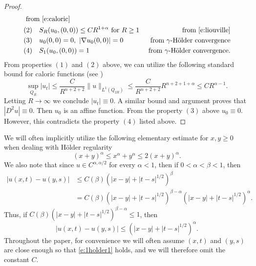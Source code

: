 \documentclass{amsart}
\numberwithin{equation}{section}
\begin{document}
\begin{proof}
\[\begin{aligned}
  &\text{ from } \eqref{e:caloric}\\
  &(2) \quad S_R(u_0,(0,0))\leq CR^{1+\alpha} \text{ for } R\geq 1 &\text{ from } \eqref{e:liouville} \\
  &(3) \quad u_0(0,0)=0, \ |\nabla u_0(0,0)|=0 &\text{ from $\gamma$-H\"older convergence} \\
  &(4) \quad S_1(u_0,(0,0))=1 &\text{ from $\gamma$-H\"older convergence}.
 \end{aligned}
 \]
 From properties $(1)$ and $(2)$ above, we can utilize the following standard bound for caloric functions (see \cite{e10})
 \[
 \sup_{Q_{R}} |u_t| \leq \frac{C}{R^{n+2+2}} \| u \|_{L^1(Q_{2R})}\leq \frac{C}{R^{n+2+2}} R^{n+2+1+\alpha}\leq C R^{\alpha-1}. 
 \]
 Letting $R \to \infty$ we conclude $|u_t|\equiv 0$. A similar bound and argument proves that $|D^2 u|\equiv 0$. Then $u_0$ is an affine function. From the property $(3)$ above $u_0 \equiv 0$. However, this contradicts the property $(4)$ listed above. 
\end{proof}

 We will often implicitly utilize the following elementary estimate for $x,y\geq0$ when dealing with H\"older regularity
 \begin{equation} \label{e:alphabound}
  (x+y)^{\alpha} \leq x^{\alpha}+y^{\alpha} \leq 2(x+y)^{\alpha}. 
 \end{equation}
 We also note that since $u \in C^{\alpha,\alpha/2}$ for every $\alpha<1$, then if $0< \alpha<\beta<1$,
 then 
 \[
 \begin{aligned}
 |u(x,t)-u(y,s)| &\leq C(\beta)(|x-y|+ |t-s|^{1/2})^{\beta}\\
 &= C(\beta) (|x-y|+ |t-s|^{1/2})^{\beta-\alpha}(|x-y|+ |t-s|^{1/2})^{\alpha}. 
 \end{aligned}
 \]
 Thus, if $C(\beta) (|x-y|+ |t-s|^{1/2})^{\beta-\alpha}\leq 1$, then 
 \begin{equation} \label{e:1holder1}
 |u(x,t)-u(y,s)| \leq (|x-y|+ |t-s|^{1/2})^{\alpha}. 
 \end{equation}
 Throughout the paper, for convenience we will often assume $(x,t)$ and $(y,s)$ are close enough so that \eqref{e:1holder1} holds, and we will therefore omit the constant $C$. 
\end{document}
